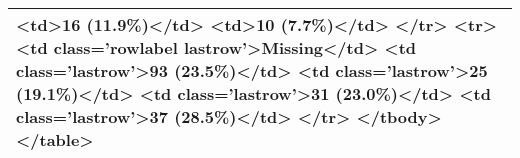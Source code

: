 \begin{table}[!tbp]
\begin{center}
\begin{tabular}{l}
\textless td\textgreater 16 (11.9\%)\textless /td\textgreater 
\textless td\textgreater 10 (7.7\%)\textless /td\textgreater 
\textless /tr\textgreater 
\textless tr\textgreater 
\textless td class='rowlabel lastrow'\textgreater Missing\textless /td\textgreater 
\textless td class='lastrow'\textgreater 93 (23.5\%)\textless /td\textgreater 
\textless td class='lastrow'\textgreater 25 (19.1\%)\textless /td\textgreater 
\textless td class='lastrow'\textgreater 31 (23.0\%)\textless /td\textgreater 
\textless td class='lastrow'\textgreater 37 (28.5\%)\textless /td\textgreater 
\textless /tr\textgreater 
\textless /tbody\textgreater 
\textless /table\textgreater 
\tabularnewline
\hline
\end{tabular}\end{center}
\end{table}
